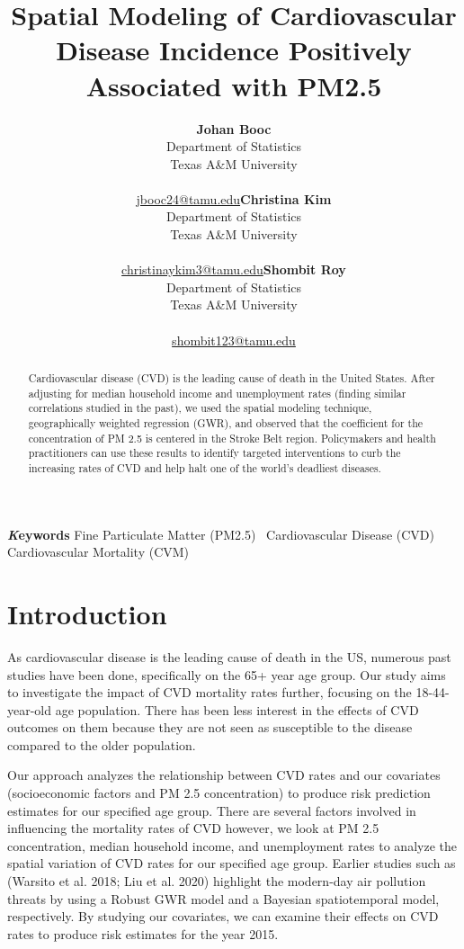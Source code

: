 \documentclass[
]{article}
\title{Spatial Modeling of Cardiovascular Disease Incidence Positively
Associated with PM2.5}
\author{\textbf{Johan Booc}\\Department of Statistics\\Texas A\&M
University\\\\\href{mailto:jbooc24@tamu.edu}{jbooc24@tamu.edu}\asep\textbf{Christina
Kim}\\Department of Statistics\\Texas A\&M
University\\\\\href{mailto:christinaykim3@tamu.edu}{christinaykim3@tamu.edu}\asep\textbf{Shombit
Roy}\\Department of Statistics\\Texas A\&M
University\\\\\href{mailto:shombit123@tamu.edu}{shombit123@tamu.edu}}
\date{}
\begin{document}
\maketitle
\begin{abstract}
Cardiovascular disease (CVD) is the leading cause of death in the United
States. After adjusting for median household income and unemployment
rates (finding similar correlations studied in the past), we used the
spatial modeling technique, geographically weighted regression (GWR),
and observed that the coefficient for the concentration of PM 2.5 is
centered in the Stroke Belt region. Policymakers and health
practitioners can use these results to identify targeted interventions
to curb the increasing rates of CVD and help halt one of the world's
deadliest diseases.
\end{abstract}
{\bfseries \emph Keywords}
\def\sep{\textbullet\ }
Fine Particulate Matter (PM2.5) \sep Cardiovascular Disease (CVD) \sep 
Cardiovascular Mortality (CVM)


\section{Introduction}\label{sec-intro}

As cardiovascular disease is the leading cause of death in the US,
numerous past studies have been done, specifically on the 65+ year age
group. Our study aims to investigate the impact of CVD mortality rates
further, focusing on the 18-44-year-old age population. There has been
less interest in the effects of CVD outcomes on them because they are
not seen as susceptible to the disease compared to the older
population.~

Our approach analyzes the relationship between CVD rates and our
covariates (socioeconomic factors and PM 2.5 concentration) to produce
risk prediction estimates for our specified age group. There are several
factors involved in influencing the mortality rates of CVD however, we
look at PM 2.5 concentration, median household income, and unemployment
rates to analyze the spatial variation of CVD rates for our specified
age group. Earlier studies such as (Warsito et al. 2018; Liu et al.
2020) highlight the modern-day air pollution threats by using a Robust
GWR model and a Bayesian spatiotemporal model, respectively. By studying
our covariates, we can examine their effects on CVD rates to produce
risk estimates for the year 2015.
\end{document}
